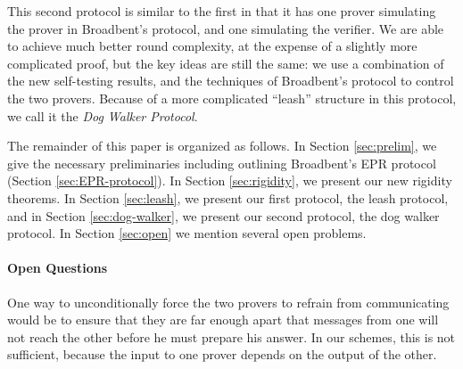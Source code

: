 \documentclass[11pt]{article}
\theoremstyle{remark}
\theoremstyle{definition}
\begin{document}
This second protocol is similar to the first in that it has one prover simulating the prover in Broadbent's protocol, and one simulating the verifier. We are able to achieve much better round complexity, at the expense of a slightly more complicated proof, but the key ideas are still the same: we use a combination of the new self-testing results, and the techniques of Broadbent's protocol to control the two provers. Because of a more complicated ``leash'' structure in this protocol, we call it the \emph{Dog Walker Protocol}.


The remainder of this paper is organized as follows. In Section \ref{sec:prelim}, we give the necessary preliminaries including outlining Broadbent's EPR protocol (Section \ref{sec:EPR-protocol}). In Section \ref{sec:rigidity}, we present our new rigidity theorems. In Section \ref{sec:leash}, we present our first protocol, the leash protocol, and in Section \ref{sec:dog-walker}, we present our second protocol, the dog walker protocol. In Section \ref{sec:open} we mention several open problems. 

\paragraph{Open Questions} One way to unconditionally force the two provers to refrain from communicating would be to ensure that they are far enough apart that messages from one will not reach the other before he must prepare his answer. In our schemes, this is not sufficient, because the input to one prover depends on the output of the other. 
\end{document}
